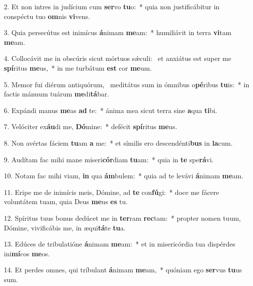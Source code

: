 2. Et non intres in judícium cum \textbf{ser}vo \textbf{tu}o:~*  quia non justificábitur in conspéctu tuo \textbf{om}nis \textbf{vi}vens.\

3. Quia persecútus est inimícus \textbf{á}nimam \textbf{me}am:~*  humiliávit in terra \textbf{vi}tam \textbf{me}am.\

4. Collocávit me in obscúris sicut mórtuos sǽculi: \dag\  et anxiátus est super me \textbf{spí}ritus \textbf{me}us,~*  in me turbátum \textbf{est} cor \textbf{me}um.\

5. Memor fui diérum antiquórum, \dag\  meditátus sum in ómnibus o\textbf{pé}ribus \textbf{tu}is:~*  in factis mánuum tuárum \textbf{me}di\textbf{tá}bar.\

6. Expándi manus \textbf{me}as \textbf{ad} te:~*  ánima mea sicut terra sine \textbf{a}qua \textbf{ti}bi.\

7. Velóciter ex\textbf{áu}di me, \textbf{Dó}mine:~*  defécit \textbf{spí}ritus \textbf{me}us.\

8. Non avértas fáciem \textbf{tu}am \textbf{a} me:~*  et símilis ero descendénti\textbf{bus} in \textbf{la}cum.\

9. Audítam fac mihi mane miseri\textbf{cór}diam \textbf{tu}am:~*  quia in \textbf{te} spe\textbf{rá}vi.\

10. Notam fac mihi viam, \textbf{in} qua \textbf{ám}bulem:~*  quia ad te levávi \textbf{á}nimam \textbf{me}am.\

11. Eripe me de inimícis meis, Dómine, ad \textbf{te} con\textbf{fú}gi:~*  doce me fácere voluntátem tuam, quia Deus \textbf{me}us \textbf{es} tu.\

12. Spíritus tuus bonus dedúcet me in \textbf{ter}ram \textbf{rec}tam:~*  propter nomen tuum, Dómine, vivificábis me, in æqui\textbf{tá}te \textbf{tu}a.\

13. Edúces de tribulatióne \textbf{á}nimam \textbf{me}am:~*  et in misericórdia tua dispérdes ini\textbf{mí}cos \textbf{me}os.\

14. Et perdes omnes, qui tríbulant \textbf{á}nimam \textbf{me}am,~*  quóniam ego \textbf{ser}vus \textbf{tu}us sum.\

